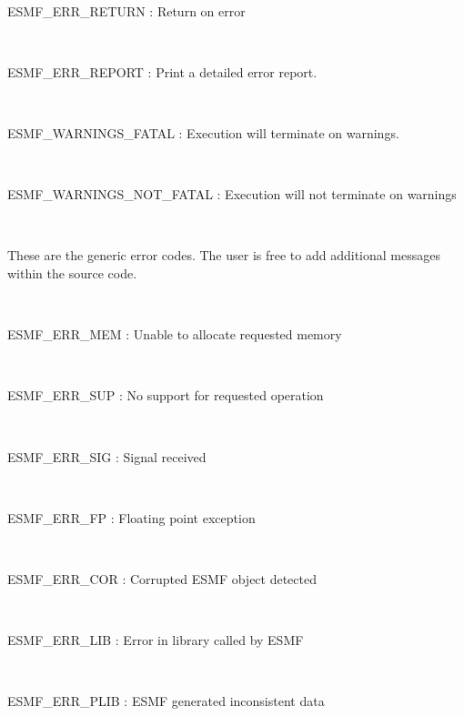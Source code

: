 \mbox{}\hrulefill\ 
 

  ESMF\_ERR\_RETURN : Return on error 
 
\mbox{}\hrulefill\ 
 

  ESMF\_ERR\_REPORT : Print a detailed error report. 
 
\mbox{}\hrulefill\ 
 

  ESMF\_WARNINGS\_FATAL : Execution will terminate on warnings. 
 
\mbox{}\hrulefill\ 
 

  ESMF\_WARNINGS\_NOT\_FATAL : Execution will not terminate on warnings 
 
\mbox{}\hrulefill\ 
 

   These are the generic error codes.  The user is free to add
   additional messages within the source code. 
 
\mbox{}\hrulefill\ 
 

  ESMF\_ERR\_MEM : Unable to allocate requested memory 
 
\mbox{}\hrulefill\ 
 

  ESMF\_ERR\_SUP : No support for requested operation 
 
\mbox{}\hrulefill\ 
 

  ESMF\_ERR\_SIG : Signal received 
 
\mbox{}\hrulefill\ 
 

  ESMF\_ERR\_FP : Floating point exception 
 
\mbox{}\hrulefill\ 
 

  ESMF\_ERR\_COR : Corrupted ESMF object detected 
 
\mbox{}\hrulefill\ 
 

  ESMF\_ERR\_LIB : Error in library called by ESMF 
 
\mbox{}\hrulefill\ 
 

  ESMF\_ERR\_PLIB : ESMF generated inconsistent data 
 
